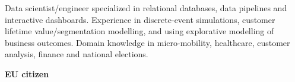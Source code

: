 

\begin{cvparagraph}
\begin{minipage}[t]{0.4\textwidth} %
Data scientist/engineer specialized in relational databases, data pipelines and
interactive dashboards. Experience in discrete-event simulations, customer
lifetime value/segmentation modelling, and using explorative modelling of business outcomes.
Domain knowledge in micro-mobility, healthcare, customer analysis, finance and national elections.

\medskip
\textbf{EU citizen}

\end{minipage}
\hfill
\begin{minipage}[t]{0.55\textwidth} %

\end{minipage}
\end{cvparagraph}

